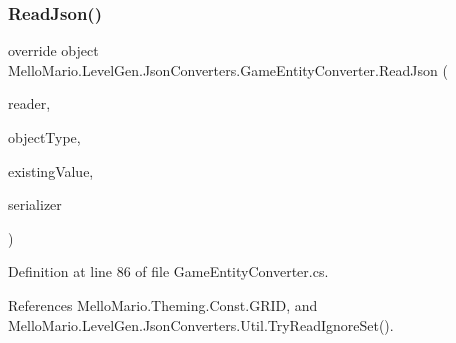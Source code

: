 \subsubsection{Read\+Json()}
{\footnotesize\ttfamily override object Mello\+Mario.\+Level\+Gen.\+Json\+Converters.\+Game\+Entity\+Converter.\+Read\+Json (\begin{DoxyParamCaption}\item[{Json\+Reader}]{reader,  }\item[{Type}]{object\+Type,  }\item[{object}]{existing\+Value,  }\item[{Json\+Serializer}]{serializer }\end{DoxyParamCaption})}



Definition at line 86 of file Game\+Entity\+Converter.\+cs.



References Mello\+Mario.\+Theming.\+Const.\+G\+R\+ID, and Mello\+Mario.\+Level\+Gen.\+Json\+Converters.\+Util.\+Try\+Read\+Ignore\+Set().


